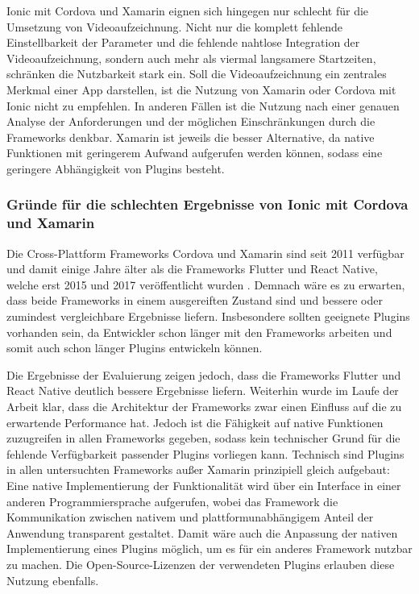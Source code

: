 Ionic mit Cordova und Xamarin eignen sich hingegen nur schlecht für die Umsetzung von Videoaufzeichnung.
Nicht nur die komplett fehlende Einstellbarkeit der Parameter und die fehlende nahtlose Integration der Videoaufzeichnung, sondern auch mehr als viermal langsamere Startzeiten, schränken die Nutzbarkeit stark ein.
Soll die Videoaufzeichnung ein zentrales Merkmal einer App darstellen, ist die Nutzung von Xamarin oder Cordova mit Ionic nicht zu empfehlen.
In anderen Fällen ist die Nutzung nach einer genauen Analyse der Anforderungen und der möglichen Einschränkungen durch die Frameworks denkbar.
Xamarin ist jeweils die besser Alternative, da native Funktionen mit geringerem Aufwand aufgerufen werden können, sodass eine geringere Abhängigkeit von Plugins besteht.


\subsubsection{Gründe für die schlechten Ergebnisse von Ionic mit Cordova und Xamarin}
Die Cross-Plattform Frameworks Cordova und Xamarin sind seit 2011 verfügbar und damit einige Jahre älter als die Frameworks Flutter und React Native, welche erst 2015 und 2017 veröffentlicht wurden \cite{Steyer_Cordova,Sharma_Flutter,Xamarin_EOL,ReactNative_Release}.
Demnach wäre es zu erwarten, dass beide Frameworks in einem ausgereiften Zustand sind und bessere oder zumindest vergleichbare Ergebnisse liefern.
Insbesondere sollten geeignete Plugins vorhanden sein, da Entwickler schon länger mit den Frameworks arbeiten und somit auch schon länger Plugins entwickeln können.

Die Ergebnisse der Evaluierung zeigen jedoch, dass die Frameworks Flutter und React Native deutlich bessere Ergebnisse liefern.
Weiterhin wurde im Laufe der Arbeit klar, dass die Architektur der Frameworks zwar einen Einfluss auf die zu erwartende Performance hat.
Jedoch ist die Fähigkeit auf native Funktionen zuzugreifen in allen Frameworks gegeben, sodass kein technischer Grund für die fehlende Verfügbarkeit passender Plugins vorliegen kann.
Technisch sind Plugins in allen untersuchten Frameworks außer Xamarin prinzipiell gleich aufgebaut: Eine native Implementierung der Funktionalität wird über ein Interface in einer anderen Programmiersprache aufgerufen, wobei das Framework die Kommunikation zwischen nativem und plattformunabhängigem Anteil der Anwendung transparent gestaltet.
Damit wäre auch die Anpassung der nativen Implementierung eines Plugins möglich, um es für ein anderes Framework nutzbar zu machen.
Die Open-Source-Lizenzen der verwendeten Plugins erlauben diese Nutzung ebenfalls.

